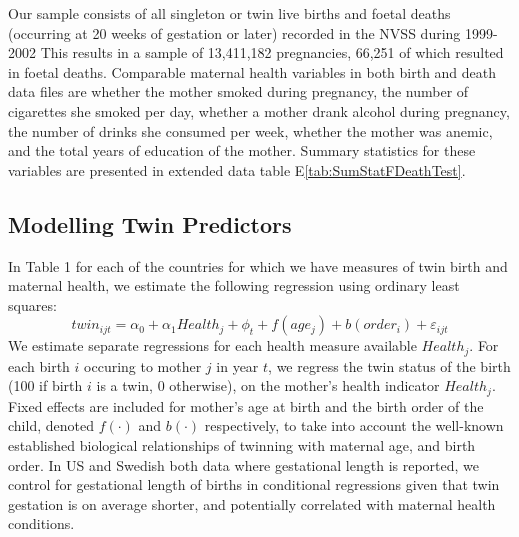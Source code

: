 \documentclass{nature}
\begin{document}
\begin{linenumbers}
Our sample consists of all singleton or twin live births and foetal deaths (occurring at 20 weeks of gestation or later) recorded in the NVSS during 1999-2002  This results in a sample of 13,411,182 pregnancies, 66,251 of which resulted in foetal deaths.  Comparable maternal health variables in both birth and death data files are whether the mother smoked during pregnancy, the number of cigarettes she smoked per day, whether a mother drank alcohol during pregnancy, the number of drinks she consumed per week, whether the mother was anemic, and the total years of education of the mother.  Summary statistics for these variables are presented in extended data table E\ref{tab:SumStatFDeathTest}.

\subsection{Modelling Twin Predictors}


In Table 1 for each of the countries for which we have measures of twin birth and maternal health, we estimate the following regression using ordinary least squares:
\begin{equation}
  twin_{ijt}=\alpha_0 + \alpha_1 Health_j + \phi_t + f(age_j) + b(order_i) + \varepsilon_{ijt}
\end{equation}
We estimate separate regressions for each health measure available $Health_j$. For each birth $i$ occuring to mother $j$ in year $t$, we regress the twin status of the birth (100 if birth $i$ is a twin, 0 otherwise), on the mother's health indicator $Health_j$. Fixed effects are included for mother's age at birth and the birth order of the child, denoted $f(\cdot)$ and $b(\cdot)$ respectively, to take into account the well-known established biological relationships of twinning with maternal age, and birth order. In US and Swedish both data where gestational length is reported, we control for gestational length of births in conditional regressions given that twin gestation is on average shorter, and potentially correlated with maternal health conditions\cite{Morrison2005}.  


\end{linenumbers}
\end{document}
